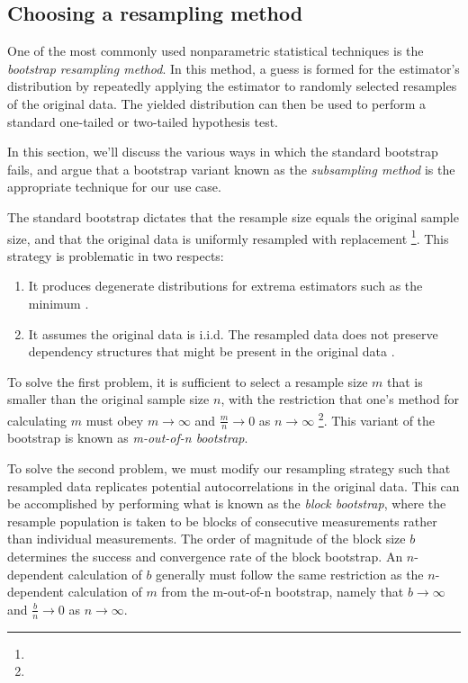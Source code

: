 \documentclass[conference]{IEEEtran}
\begin{document}
\subsection{Choosing a resampling method}

One of the most commonly used nonparametric statistical techniques is the \textit{bootstrap
resampling method}. In this method, a guess is formed for the estimator's distribution by
repeatedly applying the estimator to randomly selected resamples of the original data. The
yielded distribution can then be used to perform a standard one-tailed or two-tailed
hypothesis test.

In this section, we'll discuss the various ways in which the standard bootstrap fails,
and argue that a bootstrap variant known as the \textit{subsampling method} is the
appropriate technique for our use case.

The standard bootstrap dictates that the resample size equals the original sample size,
and that the original data is uniformly resampled with replacement \footnote{}. This strategy is problematic in two respects:

\begin{enumerate}
    \item It produces degenerate distributions for extrema estimators such as the minimum .
    \item It assumes the original data is i.i.d. The resampled data does not preserve dependency
    structures that might be present in the original data .
\end{enumerate}

To solve the first problem, it is sufficient to select a resample size $m$ that is smaller
than the original sample size $n$, with the restriction that one's method for calculating
$m$ must obey $m \to \infty$ and $\frac{m}{n} \to 0$ as $n \to \infty$
\footnote{}. This variant of
the bootstrap is known as \textit{m-out-of-n bootstrap}.

To solve the second problem, we must modify our resampling strategy such that resampled data
replicates potential autocorrelations in the original data. This can be accomplished by
performing what is known as the \textit{block bootstrap}, where the resample population is
taken to be blocks of consecutive measurements rather than individual measurements. The
order of magnitude of the block size $b$ determines the success and convergence rate of the
block bootstrap. An $n$-dependent calculation of $b$ generally must follow the same
restriction as the $n$-dependent calculation of $m$ from the m-out-of-n bootstrap, namely
that $b \to \infty$ and $\frac{b}{n} \to 0$ as $n \to \infty$.
\end{document}
